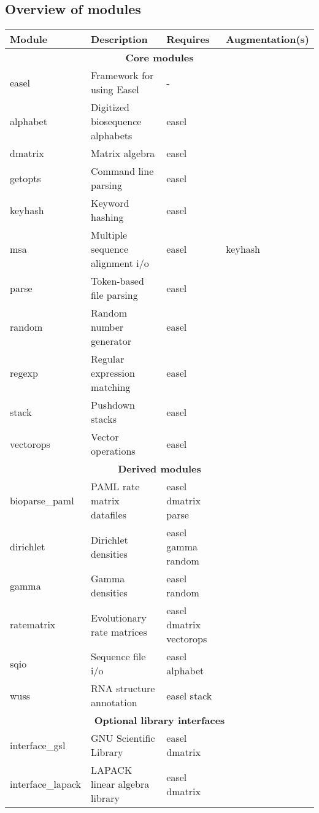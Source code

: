 \subsection{Overview of modules}
\begin{tabular}{llll}\hline
\textbf{Module} & \textbf{Description}       & \textbf{Requires} & \textbf{Augmentation(s)}\\\hline
  \multicolumn{4}{c}{\textbf{Core modules}}\\
easel           & Framework for using Easel         &  -             & \\
alphabet        & Digitized biosequence alphabets   & easel          & \\
dmatrix         & Matrix algebra                    & easel          & \\ 
getopts         & Command line parsing              & easel          & \\
keyhash         & Keyword hashing                   & easel          & \\
msa             & Multiple sequence alignment i/o   & easel          & keyhash \\
parse           & Token-based file parsing          & easel          & \\
random          & Random number generator           & easel          & \\
regexp          & Regular expression matching       & easel          & \\
stack           & Pushdown stacks                   & easel          & \\
vectorops       & Vector operations                 & easel          & \\\hline
  \multicolumn{4}{c}{\textbf{Derived modules}}\\
bioparse\_paml  & PAML rate matrix datafiles        & easel dmatrix parse & \\
dirichlet       & Dirichlet densities               & easel gamma random & \\ 
gamma           & Gamma densities                   & easel random & \\
ratematrix      & Evolutionary rate matrices        & easel dmatrix vectorops & \\
sqio            & Sequence file i/o                 & easel alphabet & \\
wuss            & RNA structure annotation          & easel stack    & \\\hline
  \multicolumn{4}{c}{\textbf{Optional library interfaces}}\\
interface\_gsl    & GNU Scientific Library          & easel dmatrix & \\
interface\_lapack & LAPACK linear algebra library   & easel dmatrix & \\\hline
\end{tabular}



